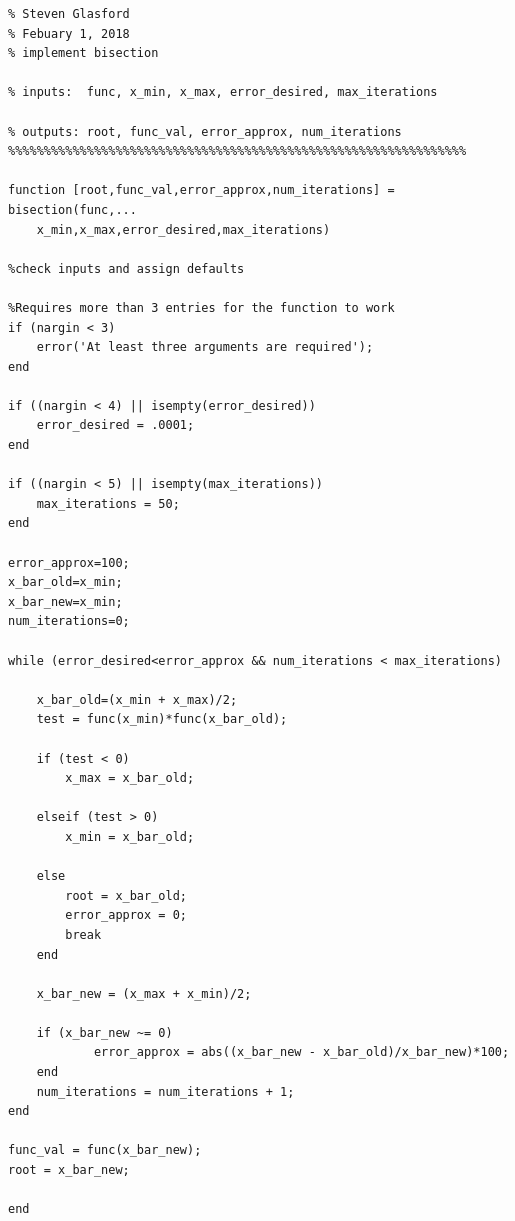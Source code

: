 \documentclass[11pt]{article}
\begin{document}
\begin{lstlisting}[caption={MATLAB code for bisection}, label = {code:bisection},frame=tb]
%%%%%%%%%%%%%%%%%%%%%%%%%%%%%%%%%%%%%%%%%%%%%%%%%%%%%%%%%%%%%
% Steven Glasford
% Febuary 1, 2018
% implement bisection 

% inputs:  func, x_min, x_max, error_desired, max_iterations

% outputs: root, func_val, error_approx, num_iterations
%%%%%%%%%%%%%%%%%%%%%%%%%%%%%%%%%%%%%%%%%%%%%%%%%%%%%%%%%%%%%%%%

function [root,func_val,error_approx,num_iterations] = bisection(func,...
    x_min,x_max,error_desired,max_iterations)

%check inputs and assign defaults

%Requires more than 3 entries for the function to work
if (nargin < 3)
    error('At least three arguments are required');
end

if ((nargin < 4) || isempty(error_desired))
    error_desired = .0001;
end

if ((nargin < 5) || isempty(max_iterations))
    max_iterations = 50;
end

error_approx=100;
x_bar_old=x_min;
x_bar_new=x_min;
num_iterations=0;

while (error_desired<error_approx && num_iterations < max_iterations)
    
    x_bar_old=(x_min + x_max)/2;
    test = func(x_min)*func(x_bar_old);
    
    if (test < 0)
        x_max = x_bar_old;
           
    elseif (test > 0)
        x_min = x_bar_old;
        
    else
        root = x_bar_old;
        error_approx = 0;
        break
    end
    
    x_bar_new = (x_max + x_min)/2;
    
    if (x_bar_new ~= 0)
            error_approx = abs((x_bar_new - x_bar_old)/x_bar_new)*100;
    end 
    num_iterations = num_iterations + 1;
end

func_val = func(x_bar_new);
root = x_bar_new;

end
\end{lstlisting}
\end{document}
